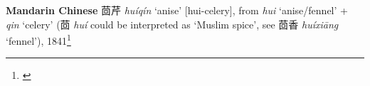 \begin{etymology}\label{ety:huiqin}
\textbf{Mandarin Chinese} {茴芹} \textit{huíqín} `anise' [hui-celery], from \textit{hui} `anise/fennel' + \textit{qin} `celery' (茴 \textit{huí} could be interpreted as `Muslim spice', see 茴香 \textit{huíxiāng} `fennel'), 1841\footnote{\textcite{kleeman_oxford_2010, hu_food_2005}}
\end{etymology}